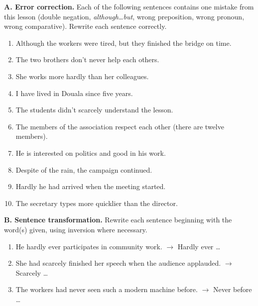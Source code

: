 \documentclass[11pt]{article}
\begin{document}
\begin{exercice}
\textbf{A. Error correction.} Each of the following sentences contains one mistake from this lesson (double negation, \emph{although\ldots but}, wrong preposition, wrong pronoun, wrong comparative). Rewrite each sentence correctly.
\begin{enumerate}
\item Although the workers were tired, but they finished the bridge on time.
\item The two brothers don't never help each others.
\item She works more hardly than her colleagues.
\item I have lived in Douala since five years.
\item The students didn't scarcely understand the lesson.
\item The members of the association respect each other (there are twelve members).
\item He is interested on politics and good in his work.
\item Despite of the rain, the campaign continued.
\item Hardly he had arrived when the meeting started.
\item The secretary types more quicklier than the director.
\end{enumerate}
\textbf{B. Sentence transformation.} Rewrite each sentence beginning with the word(s) given, using inversion where necessary.
\begin{enumerate}
\item He hardly ever participates in community work. $\rightarrow$ Hardly ever \ldots
\item She had scarcely finished her speech when the audience applauded. $\rightarrow$ Scarcely \ldots
\item The workers had never seen such a modern machine before. $\rightarrow$ Never before \ldots
\end{enumerate}
\end{exercice}
\end{document}
